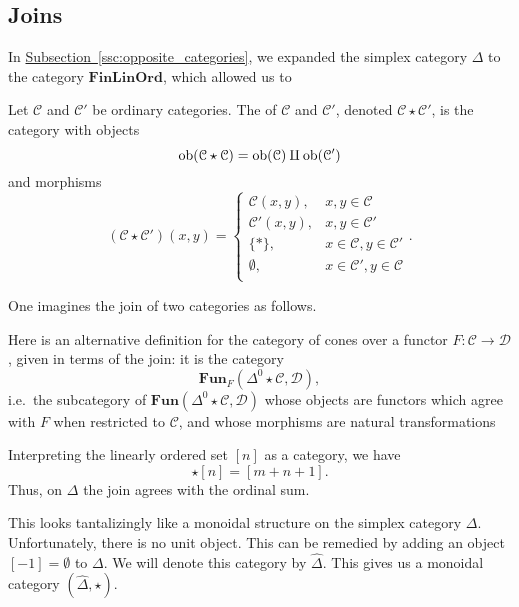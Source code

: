\documentclass[main.tex]{subfiles}
\begin{document}
\subsection{Joins}
\label{ssc:joins}

In \hyperref[ssc:opposite_categories]{Subsection~\ref*{ssc:opposite_categories}}, we expanded the simplex category $\Delta$ to the category $\mathbf{FinLinOrd}$, which allowed us to

\begin{definition}
  \label{def:join_of_categories}
  Let $\mathcal{C}$ and $\mathcal{C}'$ be ordinary categories. The  of $\mathcal{C}$ and $\mathcal{C}'$, denoted $\mathcal{C} \star \mathcal{C}'$, is the category with objects
  \begin{equation*}
    \operatorname{\mathrm{ob}}(\mathcal{C} \star \mathcal{C}) = \operatorname{\mathrm{ob}}(\mathcal{C}) \amalg \operatorname{\mathrm{ob}}(\mathcal{C}')
  \end{equation*}
  and morphisms
  \begin{equation*}
    (\mathcal{C} \star \mathcal{C}')(x, y) =
    \begin{cases}
      \mathcal{C}(x, y), & x, y \in \mathcal{C} \\
      \mathcal{C}'(x, y), & x, y \in \mathcal{C}' \\
      \{*\}, & x \in \mathcal{C}, y \in \mathcal{C}' \\
      \emptyset, & x \in \mathcal{C}', y \in \mathcal{C} \\
    \end{cases}.
  \end{equation*}
\end{definition}

One imagines the join of two categories as follows.

\begin{example}
  Here is an alternative definition for the category of cones over a functor $F\colon \mathcal{C} \to \mathcal{D}$, given in terms of the join: it is the category
  \begin{equation*}
    \mathbf{Fun}_{F}(\Delta^{0} \star \mathcal{C}, \mathcal{D}),
  \end{equation*}
  i.e.\ the subcategory of $\mathbf{Fun}(\Delta^{0} \star \mathcal{C}, \mathcal{D})$ whose objects are functors which agree with $F$ when restricted to $\mathcal{C}$, and whose morphisms are natural transformations
\end{example}

\begin{example}
  Interpreting the linearly ordered set $[n]$ as a category, we have
  \begin{equation*}
    [m] \star [n] = [m + n + 1].
  \end{equation*}
  Thus, on $\Delta$ the join agrees with the ordinal sum.
\end{example}
This looks tantalizingly like a monoidal structure on the simplex category $\Delta$. Unfortunately, there is no unit object. This can be remedied by adding an object $[-1] = \emptyset$ to $\Delta$. We will denote this category by $\hat{\Delta}$. This gives us a monoidal category $(\hat{\Delta}, \star)$.
\end{document}
